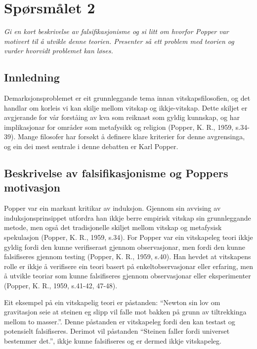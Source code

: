 \documentclass[
  letterpaper,
  DIV=11,
  numbers=noendperiod]{scrreprt}
\begin{document}
\section{Spørsmålet 2}\label{spuxf8rsmuxe5let-2}

\emph{Gi en kort beskrivelse av falsifikasjonisme og si litt om hvorfor
Popper var motivert til å utvikle denne teorien. Presenter så ett
problem med teorien og vurder hvorvidt problemet kan løses.}

\subsection{Innledning}\label{innledning-2}

Demarksjonsproblemet er eit grunnleggande tema innan vitskapsfilosofien,
og det handlar om korleis vi kan skilje mellom vitskap og ikkje-vitskap.
Dette skiljet er avgjerande for vår forståing av kva som reiknast som
gyldig kunnskap, og har implikasjonar for områder som metafysikk og
religion (Popper, K. R., 1959, s.34-39). Mange filosofer har forsøkt å
definere klare kriterier for denne avgrensinga, og ein dei mest sentrale
i denne debatten er Karl Popper.

\subsection{Beskrivelse av falsifikasjonisme og Poppers
motivasjon}\label{beskrivelse-av-falsifikasjonisme-og-poppers-motivasjon}

Popper var ein markant kritikar av induksjon. Gjennom sin avvising av
induksjonsprinsippet utfordra han ikkje berre empirisk vitskap sin
grunnleggande metode, men også det tradisjonelle skiljet mellom vitskap
og metafysisk spekulasjon (Popper, K. R., 1959, s.34). For Popper var
ein vitskapeleg teori ikkje gyldig fordi den kunne verifiserast gjennom
observasjonar, men fordi den kunne falsifiseres gjennom testing (Popper,
K. R., 1959, s.40). Han hevdet at vitskapens rolle er ikkje å verifisere
ein teori basert på enkeltobservasjonar eller erfaring, men å utvikle
teoriar som kunne falsifiseres gjennom observasjonar eller eksperimenter
(Popper, K. R., 1959, s.41-42, 47-48).

Eit eksempel på ein vitskapelig teori er påstanden: ``Newton sin lov om
gravitasjon seie at steinen eg slipp vil falle mot bakken på grunn av
tiltrekkinga mellom to masser.''. Denne påstanden er vitskapeleg fordi
den kan testast og potensielt falsifiseres. Derimot vil påstanden
``Steinen faller fordi universet bestemmer det.'', ikkje kunne
falsifiseres og er dermed ikkje vitskapeleg.
\end{document}
